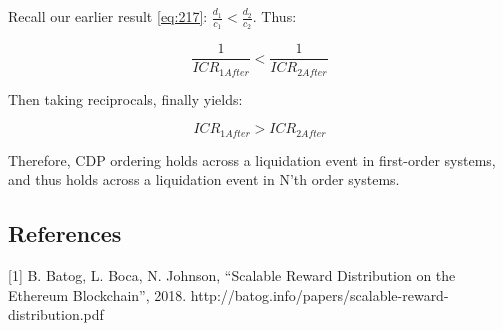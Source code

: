 \documentclass[reqno]{article}
\begin{document}
\bigskip
Recall our earlier result \ref{eq:217}: $\frac{d_1}{c_1}<\frac{d_2}{c_2}$. Thus:

\begin{equation} 
    \frac{1}{ICR_{1After}}<\frac{1}{ICR_{2After}}
\end{equation}

\bigskip
Then taking reciprocals, finally yields:

\begin{equation} 
    ICR_{1After}>ICR_{2After}
\end{equation}

\bigskip
Therefore, CDP ordering holds across a liquidation event in first-order systems, and thus holds across a liquidation event in N’th order systems.

\bigskip
\subsection*{References}

[1]  B. Batog, L. Boca, N. Johnson, “Scalable Reward Distribution on the Ethereum Blockchain”, 2018. 
http://batog.info/papers/scalable-reward-distribution.pdf
\end{document}
